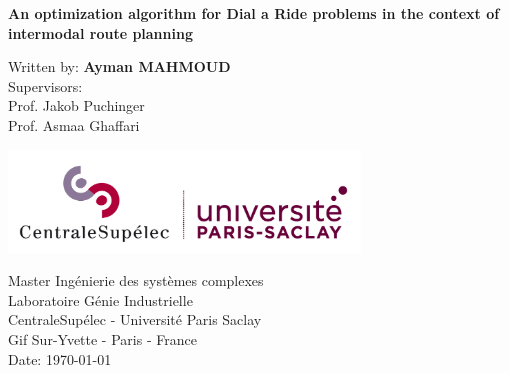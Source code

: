 \documentclass{article}
\begin{document}
\begin{titlepage}
   \begin{center}
       \vspace*{1cm}

	 \textbf{An optimization algorithm for Dial a Ride problems in the context of intermodal route planning}
\vspace{0.5cm}

                    
       \vspace{2.5cm}

       Written by:	\textbf{Ayman MAHMOUD} \\
       Supervisors: \\
       Prof. Jakob Puchinger\\
       Prof. Asmaa Ghaffari\\

       \vfill
            
       \vspace{0.8cm}
     
       \includegraphics[width=0.7\textwidth]{pictures/logo_nouveau.jpg}
            
       Master Ingénierie des systèmes complexes\\
       Laboratoire Génie Industrielle\\
       CentraleSupélec - Université Paris Saclay\\
       Gif Sur-Yvette - Paris - France\\
       Date: \today
            
   \end{center}
\end{titlepage}

\tableofcontents

\newpage
\end{document}
